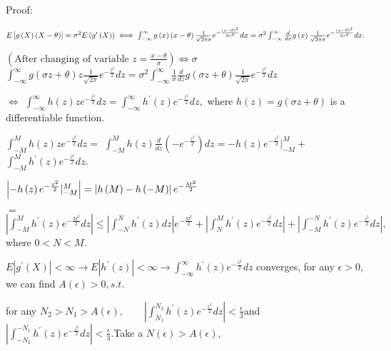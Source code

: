 \documentclass{article}
\begin{document}


Proof: 

$E\left[ g\left( X\right) \left( X-\theta \right) \right] =\sigma
^{2}E\left( g^{\prime }\left( X\right) \right) \iff \int_{-\infty }^{\infty
}g\left( x\right) \left( x-\theta \right) \frac{1}{\sqrt{2\pi }\sigma }e^{-%
\frac{\left( x-\theta \right) ^{2}}{2\sigma ^{2}}}dx=\sigma
^{2}\int_{-\infty }^{\infty }\frac{d}{dx}g\left( x\right) \frac{1}{\sqrt{%
2\pi }\sigma }e^{-\frac{\left( x-\theta \right) ^{2}}{2\sigma ^{2}}}dx.$

$\left( \text{After changing of variable }z=\frac{x-\theta }{\sigma }\right)
\iff \sigma $ $\int_{-\infty }^{\infty }g\left( \sigma z+\theta \right) z%
\frac{1}{\sqrt{2\pi }}e^{-\frac{z^{2}}{2}}dz=\sigma ^{2}\int_{-\infty
}^{\infty }\frac{1}{\sigma }\frac{d}{dz}g\left( \sigma z+\theta \right) 
\frac{1}{\sqrt{2\pi }}e^{-\frac{z^{2}}{2}}dz$

$\iff $ $\int_{-\infty }^{\infty }h\left( z\right) ze^{-\frac{z^{2}}{2}%
}dz=\int_{-\infty }^{\infty }h^{\prime }\left( z\right) e^{-\frac{z^{2}}{2}%
}dz,$ where $h\left( z\right) =g\left( \sigma z+\theta \right) $ is a
differentiable function.

$\int_{-M}^{M}h\left( z\right) ze^{-\frac{z^{2}}{2}}dz=$ $%
\int_{-M}^{M}h\left( z\right) \frac{d}{dz}\left( -e^{-\frac{z^{2}}{2}%
}\right) dz=-h\left( z\right) e^{-\frac{z^{2}}{2}}|_{-M}^{M}+$ $%
\int_{-M}^{M}h^{\prime }\left( z\right) e^{-\frac{z^{2}}{2}}dz.$

$\left\vert -h\left( z\right) e^{-\frac{z^{2}}{2}}|_{-M}^{M}\right\vert
=\left\vert h\left( M\right) -h\left( -M\right) \right\vert e^{-\frac{M^{2}}{%
2}}$

$=$ $\left\vert \int_{-M}^{M}h^{\prime }\left( z\right) e^{-\frac{M^{2}}{2}%
}dz\right\vert \leq \left\vert \int_{-N}^{N}h^{\prime }\left( z\right)
dz\right\vert e^{-\frac{M^{2}}{2}}+\left\vert \int_{N}^{M}h^{\prime }\left(
z\right) e^{-\frac{z^{2}}{2}}dz\right\vert +\left\vert
\int_{-M}^{-N}h^{\prime }\left( z\right) e^{-\frac{z^{2}}{2}}dz\right\vert ,$%
where 0$<N<M.$

$E\left\vert g^{\prime }\left( X\right) \right\vert <\infty \rightarrow
E\left\vert h^{\prime }\left( z\right) \right\vert <\infty \rightarrow
\int_{-\infty }^{\infty }h^{\prime }\left( z\right) e^{-\frac{z^{2}}{2}}dz$
converges, for any $\epsilon >0,$we can find $A\left( \epsilon \right)
>0,s.t.$

for any $N_{2}>N_{1}>A\left( \epsilon \right) ,\qquad \left\vert
\int_{N_{1}}^{N_{2}}h^{\prime }\left( z\right) e^{-\frac{z^{2}}{2}%
}dz\right\vert <\frac{\epsilon }{3}$and $\left\vert
\int_{-N_{2}}^{-N_{1}}h^{\prime }\left( z\right) e^{-\frac{z^{2}}{2}%
}dz\right\vert <\frac{\epsilon }{3}.$Take a $N\left( \epsilon \right)
>A\left( \epsilon \right) ,$
\end{document}
